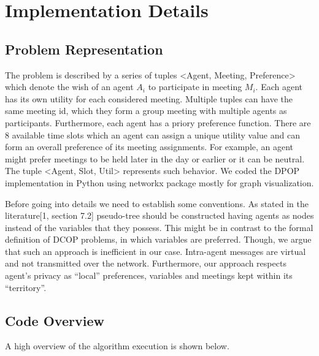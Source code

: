 \documentclass[11pt,a4paper,onecolumn]{article}
\begin{document}
	\section{Implementation Details}
	\subsection{Problem Representation}
	The problem is described by a series of tuples <Agent, Meeting, Preference> which denote the wish of an agent $A_{i}$ to participate in meeting $M_{i}$. Each agent has its own utility for each considered meeting. Multiple tuples can have the same meeting id, which they form a group meeting with multiple agents as participants. Furthermore, each agent has a priory preference function. There are 8 available time slots which an agent can assign a unique utility value and can form an overall preference of its meeting assignments. For example, an agent might prefer meetings to be held later in the day or earlier or it can be neutral. The tuple <Agent, Slot, Util> represents such behavior. We coded the DPOP implementation in Python using networkx package mostly for graph visualization. 
	
	Before going into details we need to establish some conventions. As stated in the literature[1, section 7.2] pseudo-tree should be constructed having agents as nodes instead of the variables that they possess. This might be in contrast to the formal definition of DCOP problems, in which variables are preferred. Though, we argue that such an approach is inefficient in our case. Intra-agent messages are virtual and not transmitted over the network. Furthermore, our approach respects agent's privacy as “local” preferences, variables and meetings kept within its “territory”. 
	
	\subsection{Code Overview}
	A high overview of the algorithm execution is shown below. 
	
\end{document}
